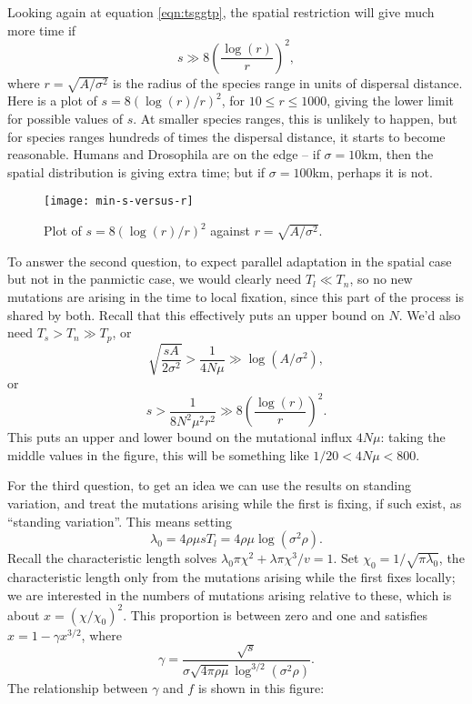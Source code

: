 \documentclass{article}
\begin{document}
Looking again at equation \eqref{eqn:tsggtp},
the spatial restriction will give much more time if
\[
  s \gg 8 \left( \frac{\log(r)}{r} \right)^2,
\]
where $r=\sqrt{A/\sigma^2}$ is the radius of the species range in units of dispersal distance.
Here is a plot of $s = 8 \left( \log(r)/r \right)^2$,
for $10 \le r \le 1000$, giving the lower limit for possible values of $s$.
At smaller species ranges, this is unlikely to happen, 
but for species ranges hundreds of times the dispersal distance, it starts to become reasonable.
Humans and Drosophila are on the edge -- if $\sigma=10$km,
then the spatial distribution is giving extra time; 
but if $\sigma=100$km, perhaps it is not.

 \begin{figure}[hht]
  \texttt{[image: min-s-versus-r]}
 \caption{Plot of $s= 8 \left( \log(r)/r \right)^2$ against $r=\sqrt{A/\sigma^2}$.} 
 \end{figure}

To answer the second question, 
to expect parallel adaptation in the spatial case but not in the panmictic case,
we would clearly need $T_l \ll T_n$, so no new mutations are arising in the time to local fixation,
since this part of the process is shared by both.
Recall that this effectively puts an upper bound on $N$.
We'd also need
$T_s > T_n \gg T_p$,
or
\begin{equation}
  \sqrt{\frac{sA}{2\sigma^2}} > \frac{1}{4N\mu} \gg \log(A/\sigma^2) ,
\end{equation}
or
\begin{equation}
  s > \frac{1}{8 N^2 \mu^2 r^2} \gg 8 \left(\frac{ \log(r) }{ r }\right)^2 .
\end{equation}
This puts an upper and lower bound on the mutational influx $4N\mu$:
taking the middle values in the figure, 
this will be something like $1/20 < 4N\mu < 800$.

For the third question,
to get an idea we can use the results on standing variation,
and treat the mutations arising while the first is fixing, if such exist, as ``standing variation''.
This means setting 
\[
  \lambda_0 = 4 \rho \mu s T_l = 4 \rho \mu \log(\sigma^2 \rho) .
\]
Recall the characteristic length solves $\lambda_0 \pi \chi^2 + \lambda \pi \chi^3/v = 1$.
Set $\chi_0 = 1/\sqrt{\pi \lambda_0}$, 
the characteristic length only from the mutations arising while the first fixes locally;
we are interested in the numbers of mutations arising relative to these,
which is about $x=(\chi/\chi_0)^2$.
This proportion is between zero and one and satisfies
$x = 1-\gamma x^{3/2}$, 
where 
\[
  \gamma = \frac{ \sqrt{s} }{ \sigma \sqrt{4 \pi \rho \mu} \log^{3/2}(\sigma^2 \rho) } .
\]
The relationship between $\gamma$ and $f$ is shown in this figure:
\end{document}
